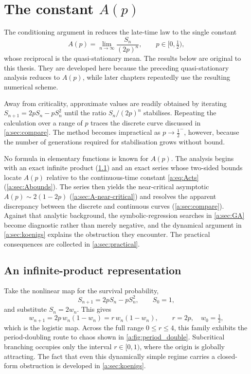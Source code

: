 \section{The constant \texorpdfstring{$A(p)$}{A(p)}}
\label{a:sec:Ap}

The conditioning argument in \ChM reduces the late-time law to the single constant
\begin{equation}
\label{a:eq:Apdef}
A(p) = \lim_{n\to\infty}\frac{S_n}{(2p)^n},
\qquad p\in[0,\tfrac12),
\end{equation}
whose reciprocal is the quasi-stationary mean.  The results below are original to
this thesis.  They are developed here because the preceding quasi-stationary
analysis reduces to $A(p)$, while later chapters repeatedly use the resulting
numerical scheme.

Away from criticality, approximate values are readily obtained by iterating
$S_{n+1}=2pS_n-pS_n^2$ until the ratio $S_n/(2p)^n$ stabilises.  Repeating the
calculation over a range of $p$ traces the discrete curve discussed in
\cref{a:sec:compare}.  The method becomes impractical as $p\to\tfrac12^-$,
however, because the number of generations required for stabilisation grows
without bound.

No formula in elementary functions is known for $A(p)$.  The analysis begins with
an exact infinite product (\cref{a:sec:product}) and an exact series whose
two-sided bounds locate $A(p)$ relative to the continuous-time constant
\cref{a:eq:Acts} (\cref{a:sec:Abounds}).  The series then yields the near-critical
asymptotic $A(p)\sim2(1-2p)$ (\cref{a:sec:A-near-critical}) and resolves the
apparent discrepancy between the discrete and continuous curves
(\cref{a:sec:compare}).  Against that analytic background, the symbolic-regression
searches in \cref{a:sec:GA} become diagnostic rather than merely negative, and the
dynamical argument in \cref{a:sec:koenigs} explains the obstruction they encounter.
The practical consequences are collected in \cref{a:sec:practical}.

\subsection{An infinite-product representation}
\label{a:sec:product}

Take the nonlinear map for the survival probability,
\begin{equation*}
S_{n+1} = 2pS_n - pS_n^2,\qquad S_0=1,
\end{equation*}
and substitute $S_n = 2w_n$. This gives
\begin{equation}
\label{a:eq:logistic}
w_{n+1} = 2p\,w_n(1-w_n) = r\,w_n(1-w_n),
\qquad r = 2p,\quad w_0 = \tfrac12 ,
\end{equation}
which is the logistic map.  Across the full range $0\leq r\leq4$, this family
exhibits the period-doubling route to chaos shown in
\cref{a:fig:period_double}.  Subcritical branching occupies only the interval
$r\in[0,1)$, where the origin is globally attracting.  The fact that even this
dynamically simple regime carries a closed-form obstruction is developed in
\cref{a:sec:koenigs}.

